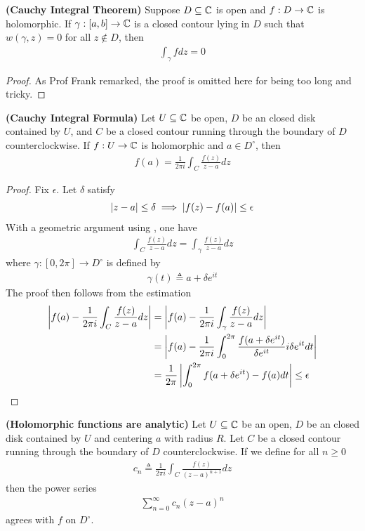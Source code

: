 \documentclass{report}
\begin{document}
\begin{theorem}
\label{CIT}
\textbf{(Cauchy Integral Theorem)} Suppose $D\subseteq \mathbb{C}$ is open and $f:D\rightarrow \mathbb{C}$ is holomorphic. If $\gamma :[a,b]\rightarrow \mathbb{C}$ is a closed contour lying in $D$ such that  $w(\gamma ,z)=0$ for all $z\not\in D$, then 
\begin{align*}
\int_\gamma  fdz=0 
\end{align*}
\end{theorem}
\begin{proof}
As Prof Frank remarked, the proof is omitted here for being too long and tricky. 
\end{proof}
\begin{theorem}
\label{CIF}
\textbf{(Cauchy Integral Formula)}  Let $U\subseteq \mathbb{C}$ be open, $D$ be an closed disk contained by  $U$, and $C$ be a closed contour running through the boundary of $D$ counterclockwise. If $f:U\rightarrow \mathbb{C}$ is holomorphic and $a\in D^\circ $, then 
\begin{align*}
f(a)= \frac{1}{2\pi  i}\int_C \frac{f(z)}{z-a}dz
\end{align*}
\end{theorem}
\begin{proof}
Fix $\epsilon $. Let $\delta$ satisfy 
\begin{align*}
\left|z-a\right|\leq \delta \implies  \left|f(z)-f(a)\right|\leq \epsilon 
\end{align*}
With a geometric argument using , one have 
\begin{align*}
\int_C \frac{f(z)}{z-a}dz=  \int_{\gamma  } \frac{f(z)}{z-a}dz
\end{align*}
where $\gamma :[0,2\pi ]\rightarrow D^\circ $ is defined by  
\begin{align*}
\gamma (t)\triangleq a+ \delta e^{it} 
\end{align*}
The proof then follows from the estimation 
\begin{align*}
  \left|f(a)- \frac{1}{2\pi i}  \int_C \frac{f(z)}{z-a}dz\right|&= \left|f(a)- \frac{1}{2\pi  i}\int_\gamma  \frac{f(z)}{z-a}dz\right| \\
                              &= \left|f(a)- \frac{1}{2\pi  i}\int_0^{2\pi  } \frac{f(a+ \delta e^{it})}{\delta e^{it} } i\delta e^{i t} dt\right|  \\
                              &= \frac{1}{2\pi } \left|\int_0^{2\pi  } f(a+ \delta e ^{it})- f(a)dt\right|\leq \epsilon 
\end{align*}
\end{proof}
\begin{theorem}
\label{Hfaa}
\textbf{(Holomorphic functions are analytic)} Let $U\subseteq \mathbb{C}$ be an open, $D$ be an closed disk contained by $U$ and centering $a$ with radius  $R$. Let $C$ be a closed contour running through the boundary of $D$ counterclockwise. If we define for all $n\geq 0$ 
\begin{align*}
c_n\triangleq  \frac{1}{2 \pi  i}\int_C \frac{f(z)}{(z-a)^{n+1}}dz
\end{align*}
then the power series 
\begin{align*}
  \sum_{n=0}^{\infty} c_n (z-a)^n
\end{align*}
agrees with $f$ on $D^{\circ }$. 
\end{theorem}
\end{document}
